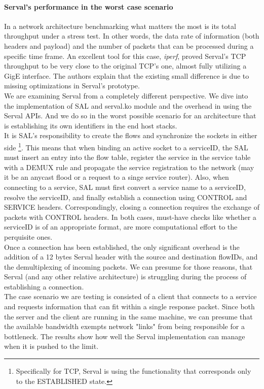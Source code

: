 \paragraph{Serval's performance in the worst case scenario}
In a network architecture benchmarking what matters the most is its total throughput under a stress test.
In other words, the data rate of information (both headers and payload) and the number of packets that can be processed during a specific time frame.
An excellent tool for this case, \emph{iperf}, proved Serval's TCP throughput to be very close to the original TCP's one, almost fully utilizing a GigE interface. 
The authors explain that the existing small difference is due to missing optimizations in Serval's prototype.
\\ \indent We are examining Serval from a completely different perspective.
We dive into the implementation of SAL and serval.ko module and the overhead in using the Serval APIs.
And we do so in the worst possible scenario for an architecture that is establishing its own identifiers in the end host stacks.
\\ \indent It is SAL's responsibility to create the flows and synchronize the sockets in either side \footnote{Specifically for TCP, Serval is using the functionality that corresponds only to the ESTABLISHED state.}.
This means that when binding an active socket to a serviceID, the SAL must insert an entry into the flow table, register the service in the service table with a DEMUX rule and propagate the service registration to the network (may it be an anycast flood or a request to a singe service router).
Also, when connecting to a service, SAL must first convert a service name to a serviceID, resolve the serviceID, and finally establish a connection using CONTROL and SERVICE headers.
Correspondingly, closing a connection requires the exchange of packets with CONTROL headers.
In both cases, must-have checks like whether a serviceID is of an appropriate format, are more computational effort to the perquisite ones.
\\ \indent Once a connection has been established, the only significant overhead is the addition of a 12 bytes Serval header with the source and destination flowIDs, and the demultiplexing of incoming packets.
We can presume for those reasons, that Serval (and any other relative architecture) is struggling during the process of establishing a connection.
\\ \indent The case scenario we are testing is consisted of a client that connects to a service and requests information that can fit within a single response packet.
Since both the server and the client are running in the same machine, we can presume that the available bandwidth exempts network "links" from being responsible for a bottleneck.
The results show how well the Serval implementation can manage when it is pushed to the limit.

